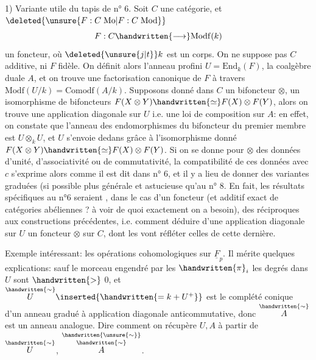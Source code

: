 1) Variante utile du tapis de n° 6. Soit $C$ une catégorie, et $\deleted{\unsure{F:C\;\mathrm{Mo}|F:C\;\mathrm{Mod}}}$
\[
F:C\handwritten{\longrightarrow}\mathrm{Modf}(k)
\]
un foncteur, où $\deleted{\unsure{j|t}}k$ est un corps. On ne suppose pas $C$ additive, ni $F$ fidèle. On définit alors l'anneau profini $U=\mathrm{End}_{k}(F)$, la coalgèbre duale $A$, et on trouve une factorisation canonique de $F$ à travers $\mathrm{Modf}(U/k)=\mathrm{Comodf}(A/k)$. Supposons donné dans $C$ un bifoncteur $\otimes$,  un isomorphisme de bifoncteurs $F(X\otimes Y)\handwritten{\simeq}F(X)\otimes F(Y)$, alors on trouve une application diagonale sur $U$ i.e. une loi de composition  sur $A$: en effet, on constate que l'anneau des endomorphismes du bifoncteur du premier membre est $U\otimes_{k}U$, et $U$ s'envoie dedans grâce à l'isomorphisme donné $F(X\otimes Y)\handwritten{\simeq}F(X)\otimes F(Y)$. Si on se donne pour $\otimes$ des données d'unité, d'associativité ou de commutativité, la compatibilité de ces données avec $c$ s'exprime alors comme il est dit dans n° 6, et il y a lieu de donner des variantes graduées (si possible plus générale et astucieuse qu'au n° 8\handwritten{)}. En fait, les résultats spécifiques au n°6 seraient , dans le cas d'un foncteur  (et additif  exact de catégories abéliennes ? à voir de quoi exactement on a besoin), des réciproques aux constructions précédentes, i.e. comment déduire d'une application diagonale sur $U$ un foncteur $\otimes$ sur $C$, dont les  vont réfléter celles de cette dernière.

Exemple intéressant: les opérations cohomologiques sur $\underline{F}_{p}$. Il mérite quelques explications: sauf le morceau engendré par les $\handwritten{\pi}_{i}$  les degrés dans $U$ sont $\handwritten{>}$ $0$, et $\overset{\handwritten{\sim}}{U}\inserted{\handwritten{=k+U^{+}}}$ est le complété conique d'un anneau gradué à application diagonale anticommutative, donc $\overset{\handwritten{\sim}}{A}$ est un anneau analogue. Dire comment on récupère $U,A$ à partir de $\overset{\handwritten{\sim}}{U}$, $\overset{\handwritten{\unsure{\sim}}}{\overset{\handwritten{\sim}}{A}}$.

